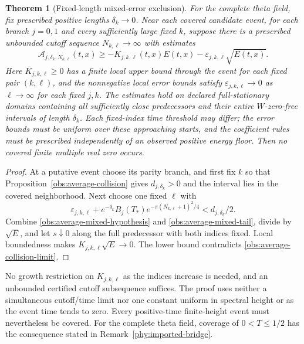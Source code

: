 \documentclass[11pt]{article}
\numberwithin{equation}{section}
\newtheorem{theorem}{Theorem}[section]
\theoremstyle{definition}
\theoremstyle{remark}
\begin{document}
\begin{theorem}[Fixed-length mixed-error exclusion]
\label{obs:average-mixed-exclusion}
For the complete theta field, fix prescribed positive lengths $\delta_k\to0$.
Near each covered candidate event, for each branch $j=0,1$ and every
sufficiently large fixed $k$, suppose there is a prescribed unbounded
cutoff sequence $N_{k,\ell}\to\infty$ with estimates
\begin{equation}
 \mathcal A_{j,\delta_k,N_{k,\ell}}(t,x)
 \ge-K_{j,k,\ell}(t,x)E(t,x)
       -\varepsilon_{j,k,\ell}\sqrt{E(t,x)}.
 \label{obs:average-mixed-hypothesis}
\end{equation}
Here $K_{j,k,\ell}\ge0$ has a finite local upper bound through the
event for each fixed pair $(k,\ell)$, and the nonnegative local error
bounds satisfy $\varepsilon_{j,k,\ell}\to0$ as $\ell\to\infty$ for
each fixed $j,k$.
The estimates hold on declared full-stationary domains containing all
sufficiently close predecessors and their entire $W$-zero-free intervals
of length $\delta_k$.
Each fixed-index time threshold may differ; the error bounds must be
uniform over these approaching starts, and the coefficient rules must
be prescribed independently of an observed positive energy floor.
Then no covered finite multiple real zero occurs.
\end{theorem}
\begin{proof}
At a putative event choose its parity branch, and first fix $k$ so
that Proposition~\ref{obs:average-collision} gives
$d_{j,\delta_k}>0$ and the interval lies in the covered neighborhood.
Next choose one fixed $\ell$ with
\[
 \varepsilon_{j,k,\ell}
 +e^{-\delta_k}B_j(T_*)e^{-\pi(N_{k,\ell}+1)^2/4}
 <d_{j,\delta_k}/2.
\]
Combine \eqref{obs:average-mixed-hypothesis} and
\eqref{obs:average-mixed-tail}, divide by $\sqrt E$, and let
$s\downarrow0$ along the full predecessor with both indices fixed.
Local boundedness makes $K_{j,k,\ell}\sqrt E\to0$.
The lower bound contradicts \eqref{obs:average-collision-limit}.
\end{proof}

No growth restriction on $K_{j,k,\ell}$ as the indices increase is
needed, and an unbounded certified cutoff subsequence suffices.
The proof uses neither a simultaneous cutoff/time limit nor one
constant uniform in spectral height or as the event time tends to zero.
Every positive-time finite-height event must nevertheless be covered.
For the complete theta field, coverage of $0<T\le1/2$ has the
consequence stated in Remark~\ref{phy:imported-bridge}.
\end{document}
